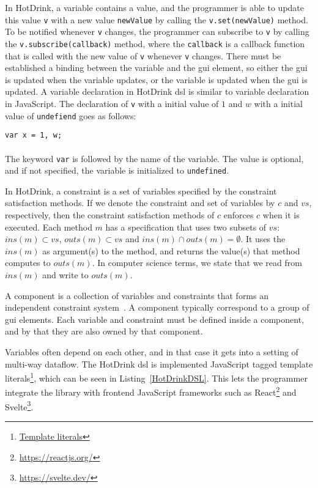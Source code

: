 In HotDrink, a variable contains a value, and the programmer is able to update this value \texttt{v} with a new value \texttt{newValue} by calling the \texttt{v.set(newValue)} method. To be notified whenever \texttt{v} changes, the programmer can subscribe to \texttt{v} by calling the \texttt{v.subscribe(callback)} method, where the \texttt{callback} is a callback function that is called with the new value of \texttt{v} whenever \texttt{v} changes. There must be established a binding between the variable and the \gls{gui} element, so either the \gls{gui} is updated when the variable updates, or the variable is updated when the \gls{gui} is updated. A variable declaration in HotDrink \gls{dsl} is similar to variable declaration in JavaScript. The declaration of \texttt{v} with a initial value of $1$ and $w$ with a initial value of \texttt{undefiend} goes as follows: 

\texttt{var x = 1, w;}\\\\
The keyword \texttt{var} is followed by the name of the variable. The value is optional, and if not specified, the variable is initialized to \texttt{undefined}. 

In HotDrink, a constraint is a set of variables specified by the constraint satisfaction methods. If we denote the constraint and set of variables by $c$ and $vs$, respectively, then the constraint satisfaction methods of $c$ enforces $c$ when it is executed. Each method $m$ has a specification that uses two subsets of $vs$: $ins(m) \subset vs$, $outs(m) \subset vs$ and $ins(m) \cap outs(m) = \emptyset$. It uses the $ins(m)$ as argument(s) to the method, and returns the value(s) that method computes to $outs(m)$. In computer science terms, we state that we read from $ins(m)$ and write to $outs(m)$.

A component is a collection of variables and constraints that forms an independent constraint system~\cite{svartveit2021multithreaded}. A component typically correspond to a group of \gls{gui} elements. Each variable and constraint must be defined inside a component, and by that they are also owned by that component. 

Variables often depend on each other, and in that case it gets into a setting of multi-way dataflow. The HotDrink \gls{dsl} is implemented JavaScript tagged template literals\footnote{\href{https://developer.mozilla.org/en-US/docs/Web/JavaScript/Reference/Template_literals}{Template literals}}, which can be seen in Listing~\ref{HotDrinkDSL}. This lets the programmer integrate the library with frontend JavaScript frameworks such as React\footnote{\url{https://reactjs.org/}} and Svelte\footnote{\url{https://svelte.dev/}}. 


